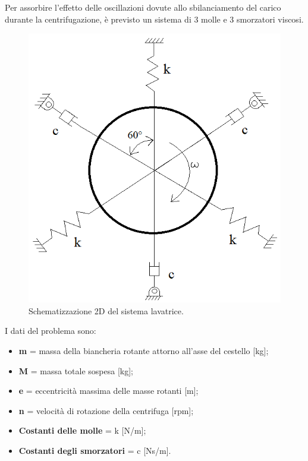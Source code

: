 Per assorbire l'effetto delle oscillazioni dovute allo sbilanciamento del carico durante la centrifugazione, è previsto un sistema di 3 molle e 3 smorzatori viscosi.
\begin{figure}[h]
    \centering
    \includegraphics[scale=0.63]{Lavatrice3Smorz3Molle.png}
    \caption{Schematizzazione 2D del sistema lavatrice.}
    \label{Modello2D}
\end{figure}

I dati del problema sono:
\begin{itemize}
    \item \textbf{m} = massa della biancheria rotante attorno all'asse del cestello [kg];
    \item \textbf{M} = massa totale sospesa [kg];
    \item \textbf{e} = eccentricità massima delle masse rotanti [m];
    \item \textbf{n} = velocità di rotazione della centrifuga [rpm];
    \item \textbf{Costanti delle molle} = k [N/m];
    \item \textbf{Costanti degli smorzatori} = c [Ns/m].
\end{itemize}

